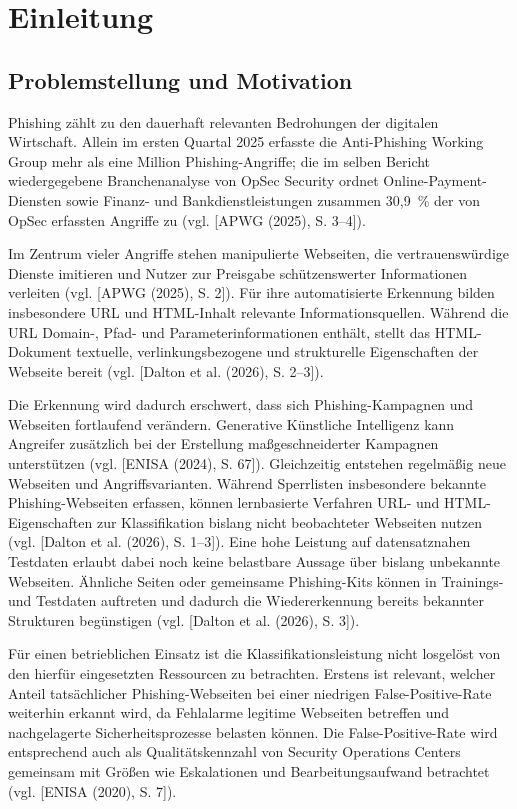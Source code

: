 \chapter{Einleitung}

\section{Problemstellung und Motivation}

Phishing zählt zu den dauerhaft relevanten Bedrohungen der digitalen Wirtschaft. Allein im ersten
Quartal 2025 erfasste die Anti-Phishing Working Group mehr als eine Million Phishing-Angriffe;
die im selben Bericht wiedergegebene Branchenanalyse von OpSec Security ordnet
Online-Payment-Diensten sowie Finanz- und Bankdienstleistungen zusammen 30,9~\%
der von OpSec erfassten Angriffe zu (vgl. [APWG (2025), S. 3--4]).

Im Zentrum vieler Angriffe stehen manipulierte Webseiten, die vertrauenswürdige Dienste imitieren
und Nutzer zur Preisgabe schützenswerter Informationen verleiten (vgl. [APWG (2025), S. 2]).
Für ihre automatisierte Erkennung bilden insbesondere URL und HTML-Inhalt relevante
Informationsquellen. Während die URL Domain-, Pfad- und Parameterinformationen enthält, stellt
das HTML-Dokument textuelle, verlinkungsbezogene und strukturelle Eigenschaften der Webseite
bereit (vgl. [Dalton et al. (2026), S. 2--3]).

Die Erkennung wird dadurch erschwert, dass sich Phishing-Kampagnen und Webseiten fortlaufend
verändern. Generative Künstliche Intelligenz kann Angreifer zusätzlich bei der Erstellung
maßgeschneiderter Kampagnen unterstützen (vgl. [ENISA (2024), S. 67]). Gleichzeitig entstehen
regelmäßig neue Webseiten und Angriffsvarianten. Während Sperrlisten insbesondere bekannte
Phishing-Webseiten erfassen, können lernbasierte Verfahren URL- und HTML-Eigenschaften zur
Klassifikation bislang nicht beobachteter Webseiten nutzen (vgl. [Dalton et al. (2026), S. 1--3]). Eine hohe Leistung auf datensatznahen Testdaten erlaubt dabei noch keine belastbare Aussage über
bislang unbekannte Webseiten. Ähnliche Seiten oder gemeinsame Phishing-Kits können in Trainings-
und Testdaten auftreten und dadurch die Wiedererkennung bereits bekannter Strukturen begünstigen
(vgl. [Dalton et al. (2026), S. 3]).

Für einen betrieblichen Einsatz ist die Klassifikationsleistung nicht losgelöst von den hierfür
eingesetzten Ressourcen zu betrachten. Erstens ist relevant, welcher Anteil tatsächlicher
Phishing-Webseiten bei einer niedrigen False-Positive-Rate weiterhin erkannt wird, da Fehlalarme
legitime Webseiten betreffen und nachgelagerte Sicherheitsprozesse belasten können. Die
False-Positive-Rate wird entsprechend auch als Qualitätskennzahl von Security Operations Centers
gemeinsam mit Größen wie Eskalationen und Bearbeitungsaufwand betrachtet
(vgl. [ENISA (2020), S. 7]).

